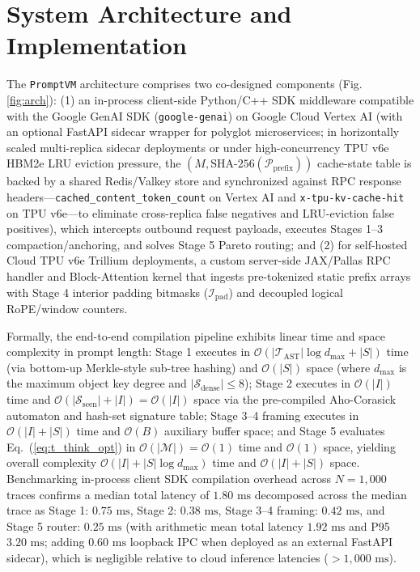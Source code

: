 \documentclass[conference,10pt]{IEEEtran}
\begin{document}
\section{System Architecture and Implementation}
\label{sec:impl}
The \texttt{PromptVM} architecture comprises two co-designed components (Fig. \ref{fig:arch}): (1) an in-process client-side Python/C++ SDK middleware compatible with the Google GenAI SDK (\texttt{google-genai}) on Google Cloud Vertex AI (with an optional FastAPI sidecar wrapper for polyglot microservices; in horizontally scaled multi-replica sidecar deployments or under high-concurrency TPU v6e HBM2e LRU eviction pressure, the $(M, \text{SHA-256}(\mathcal{P}_{\text{prefix}}))$ cache-state table is backed by a shared Redis/Valkey store and synchronized against RPC response headers---\texttt{cached\_content\_token\_count} on Vertex AI and \texttt{x-tpu-kv-cache-hit} on TPU v6e---to eliminate cross-replica false negatives and LRU-eviction false positives), which intercepts outbound request payloads, executes Stages 1--3 compaction/anchoring, and solves Stage 5 Pareto routing; and (2) for self-hosted Cloud TPU v6e Trillium deployments, a custom server-side JAX/Pallas RPC handler and Block-Attention kernel that ingests pre-tokenized static prefix arrays with Stage 4 interior padding bitmasks ($\mathcal{I}_{\text{pad}}$) and decoupled logical RoPE/window counters.

Formally, the end-to-end compilation pipeline exhibits linear time and space complexity in prompt length: Stage 1 executes in $\mathcal{O}(|\mathcal{T}_{\text{AST}}| \log d_{\max} + |S|)$ time (via bottom-up Merkle-style sub-tree hashing) and $\mathcal{O}(|S|)$ space (where $d_{\max}$ is the maximum object key degree and $|\mathcal{S}_{\text{dense}}| \le 8$); Stage 2 executes in $\mathcal{O}(|I|)$ time and $\mathcal{O}(|\mathcal{S}_{\text{seen}}| + |I|) = \mathcal{O}(|I|)$ space via the pre-compiled Aho-Corasick automaton and hash-set signature table; Stage 3--4 framing executes in $\mathcal{O}(|I| + |S|)$ time and $\mathcal{O}(B)$ auxiliary buffer space; and Stage 5 evaluates Eq.~(\ref{eq:t_think_opt}) in $\mathcal{O}(|\mathcal{M}|) = \mathcal{O}(1)$ time and $\mathcal{O}(1)$ space, yielding overall complexity $\mathcal{O}(|I| + |S| \log d_{\max})$ time and $\mathcal{O}(|I| + |S|)$ space. Benchmarking in-process client SDK compilation overhead across $N = 1{,}000$ traces confirms a median total latency of $1.80\text{ ms}$ decomposed across the median trace as Stage 1: $0.75\text{ ms}$, Stage 2: $0.38\text{ ms}$, Stage 3--4 framing: $0.42\text{ ms}$, and Stage 5 router: $0.25\text{ ms}$ (with arithmetic mean total latency $1.92\text{ ms}$ and P95 $3.20\text{ ms}$; adding $0.60\text{ ms}$ loopback IPC when deployed as an external FastAPI sidecar), which is negligible relative to cloud inference latencies ($> 1{,}000\text{ ms}$).
\end{document}
